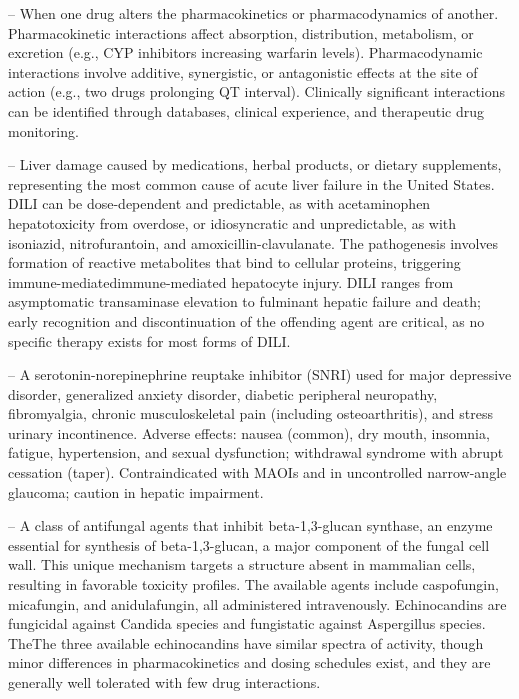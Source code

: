 -- When one drug alters the pharmacokinetics or pharmacodynamics of another. Pharmacokinetic interactions affect absorption, distribution, metabolism, or excretion (e.g., CYP inhibitors increasing warfarin levels). Pharmacodynamic interactions involve additive, synergistic, or antagonistic effects at the site of action (e.g., two drugs prolonging QT interval). Clinically significant interactions can be identified through databases, clinical experience, and therapeutic drug monitoring.

-- Liver damage caused by medications, herbal products, or dietary supplements, representing the most common cause of acute liver failure in the United States. DILI can be dose-dependent and predictable, as with acetaminophen hepatotoxicity from overdose, or idiosyncratic and unpredictable, as with isoniazid, nitrofurantoin, and amoxicillin-clavulanate. The pathogenesis involves formation of reactive metabolites that bind to cellular proteins, triggering immune-mediatedimmune-mediated hepatocyte injury. DILI ranges from asymptomatic transaminase elevation to fulminant hepatic failure and death; early recognition and discontinuation of the offending agent are critical, as no specific therapy exists for most forms of DILI.

-- A serotonin-norepinephrine reuptake inhibitor (SNRI) used for major depressive disorder, generalized anxiety disorder, diabetic peripheral neuropathy, fibromyalgia, chronic musculoskeletal pain (including osteoarthritis), and stress urinary incontinence. Adverse effects: nausea (common), dry mouth, insomnia, fatigue, hypertension, and sexual dysfunction; withdrawal syndrome with abrupt cessation (taper). Contraindicated with MAOIs and in uncontrolled narrow-angle glaucoma; caution in hepatic impairment.

-- A class of antifungal agents that inhibit beta-1,3-glucan synthase, an enzyme essential for synthesis of beta-1,3-glucan, a major component of the fungal cell wall. This unique mechanism targets a structure absent in mammalian cells, resulting in favorable toxicity profiles. The available agents include caspofungin, micafungin, and anidulafungin, all administered intravenously. Echinocandins are fungicidal against Candida species and fungistatic against Aspergillus species. TheThe three available echinocandins have similar spectra of activity, though minor differences in pharmacokinetics and dosing schedules exist, and they are generally well tolerated with few drug interactions.

